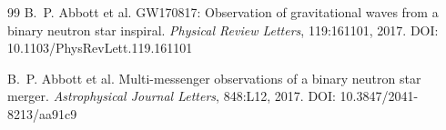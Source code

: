 \documentclass[12pt,a4paper]{article}
\begin{document}
\begin{thebibliography}{99}
            B.~P. Abbott et al.
            \newblock GW170817: Observation of gravitational waves from a binary neutron star inspiral.
            \newblock \emph{Physical Review Letters}, 119:161101, 2017.
            \newblock DOI: 10.1103/PhysRevLett.119.161101
            
            B.~P. Abbott et al.
            \newblock Multi-messenger observations of a binary neutron star merger.
            \newblock \emph{Astrophysical Journal Letters}, 848:L12, 2017.
            \newblock DOI: 10.3847/2041-8213/aa91c9
        
        \end{thebibliography}
\end{document}
